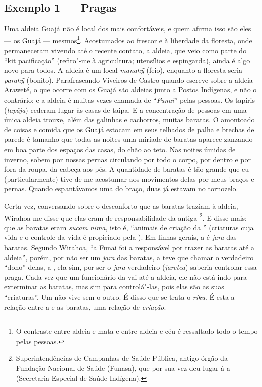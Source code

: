 \subsection{Exemplo 1 --- Pragas}

\forceindent
Uma aldeia Guajá não é local dos mais confortáveis, e quem afirma isso
são eles --- os Guajá --- mesmos\footnote{O contraste entre aldeia e mata e
  entre aldeia e céu é ressaltado todo o tempo pelas pessoas.}.
Acostumados ao frescor e à liberdade da floresta, onde permaneceram
vivendo até o recente contato, a aldeia, que veio como parte do ``kit
pacificação'' (refiro"-me à agricultura; utensílios e espingarda), ainda
é algo novo para todos. A aldeia é um local \emph{manahỹ} (feio),
enquanto a floresta seria \emph{parahỹ} (bonito). Parafraseando Viveiros
de Castro quando escreve sobre a aldeia Araweté, o que ocorre com os
Guajá são aldeias junto a Postos Indígenas, e não o contrário; e a
aldeia é muitas vezes chamada de ``\emph{Funai}'' pelas pessoas. Os
tapiris (\emph{tapãja}) cederam lugar às casas de taipa. E a
concentração de pessoas em uma única aldeia trouxe, além das galinhas e
cachorros, muitas baratas. O amontoado de coisas e comida que os Guajá
estocam em seus telhados de palha e brechas de parede é tamanho que
todas as noites uma miríade de baratas aparece zanzando em boa parte dos
espaços das casas, do chão ao teto. Nas noites úmidas de inverno, sobem
por nossas pernas circulando por todo o corpo, por dentro e por fora da
roupa, da cabeça aos pés. A quantidade de baratas é tão grande que eu
(particularmente) tive de me acostumar aos movimentos delas por meus
braços e pernas. Quando espantávamos uma do braço, duas já estavam no
tornozelo.

Certa vez, conversando sobre o desconforto que as baratas traziam à
aldeia, Wirahoa me disse que elas eram de responsabilidade da antiga
\footnote{Superintendências de Campanhas de Saúde Pública, antigo
  órgão da Fundação Nacional de Saúde (Funasa), que por sua vez deu
  lugar à a  (Secretaria Especial de Saúde Indígena).}. E disse
mais: que as baratas eram \emph{sucam nima}, isto é, ``animais de
criação da '' (criaturas cuja vida e o controle da vida é
propiciado pela ). Em linhas gerais, a  é \emph{jara} das
baratas. Segundo Wirahoa, ``a Funai foi a responsável por trazer as
baratas até a aldeia'', porém, por não ser um \emph{jara} das baratas, a
 teve que chamar o verdadeiro ``dono'' delas, a , ela sim, por
ser o \emph{jara} verdadeiro (\emph{jaretea}) saberia controlar essa
praga. Cada vez que um funcionário da  vai até a aldeia, ele não
está indo para exterminar as baratas, mas sim para controlá"-las, pois
elas são as suas ``criaturas''. Um não vive sem o outro. É disso que se
trata o \emph{riku}. É esta a relação entre a  e as baratas, uma
relação de \emph{criação}.

